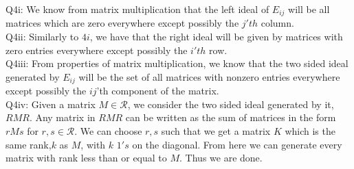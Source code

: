 \documentclass[letterpaper]{article}
\begin{document}
 
\noindent Q4i: We know from matrix multiplication that the left ideal of $E_{ij}$ will be all matrices which are zero everywhere except possibly the $j'th$ column.
\newline \\ Q4ii: Similarly to $4i$, we have that the right ideal will be given by matrices with zero entries everywhere except possibly the $i'th$ row. 
\newline \\ Q4iii: From properties of matrix multiplication, we know that the two sided ideal generated by $E_{ij}$ will be the set of all matrices with nonzero entries everywhere except possibly the $ij$'th component of the matrix.
\newline \\ Q4iv: Given a matrix $M\in \mathcal{R}$, we consider the two sided ideal generated by it, $RMR$. Any matrix in $RMR$ can be written as the sum of matrices in the form $rMs$ for $r,s\in \mathcal{R}.$ We can choose $r,s$ such that we get a matrix $K$ which is the same rank,$k$ as $M$, with $k$ $1's$ on the diagonal. From here we can generate every matrix with rank less than or equal to $M$. Thus we are done.   
\end{document}
